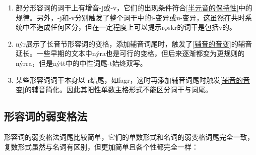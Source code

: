 \begin{enumerate}
  \def\labelenumi{\arabic{enumi})}
  \setcounter{enumi}{2}
  \item
        部分形容词的词干上有增音-j或-v，它们的出现条件符合\ref{半元音的保持性}中的规律。另外，-j和-v分别触发了整个词干中的i-变异或u-变异，这虽然在共时系统中不造成任何区分，但在一定程度上可以提示rǫskr的词干是包括v的。
  \item
        nýr展示了长音节形容词的变格，添加辅音词尾时，触发了\ref{辅音的音变}的辅音延长。一些早期的文本中nýra也是可行的变格，但后来逐渐都变为更规则的nýrra，但是nýtt中的中性词尾-t始终双写。
  \item
        某些形容词词干本身以-r结尾，如fagr，这时再添加辅音词尾时触发\ref{辅音的音变}的辅音简化。因此其阳性单数主格形式不能区分词干与词尾。
\end{enumerate}

\subsection{形容词的弱变格法}\label{形容词的弱变格法}

形容词的弱变格法词尾比较简单，它们的单数形式和名词的弱变格词尾完全一致，复数形式虽然与名词有区别，但更加简单且各个性都完全一样：

